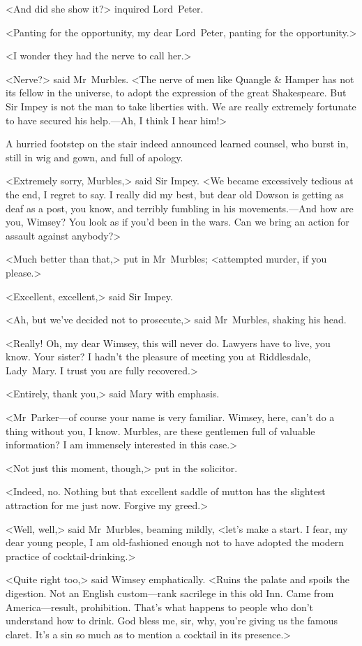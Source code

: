 <And did she show it?> inquired Lord~Peter.

<Panting for the opportunity, my dear Lord~Peter, panting for the opportunity.>

<I wonder they had the nerve to call her.>

<Nerve?> said Mr~Murbles. <The nerve of men like Quangle \& Hamper has not its fellow in the universe, to adopt the expression of the great Shakespeare. But Sir Impey is not the man to take liberties with. We are really extremely fortunate to have secured his help.—Ah, I think I hear him!>

A hurried footstep on the stair indeed announced learned counsel, who burst in, still in wig and gown, and full of apology.

<Extremely sorry, Murbles,> said Sir Impey. <We became excessively tedious at the end, I regret to say. I really did my best, but dear old Dowson is getting as deaf as a post, you know, and terribly fumbling in his movements.—And how are you, Wimsey? You look as if you'd been in the wars. Can we bring an action for assault against anybody?>

<Much better than that,> put in Mr~Murbles; <attempted murder, if you please.>

<Excellent, excellent,> said Sir Impey.

<Ah, but we've decided not to prosecute,> said Mr~Murbles, shaking his head.

<Really! Oh, my dear Wimsey, this will never do. Lawyers have to live, you know. Your sister? I hadn't the pleasure of meeting you at Riddlesdale, Lady~Mary. I trust you are fully recovered.>

<Entirely, thank you,> said Mary with emphasis.

<Mr~Parker—of course your name is very familiar. Wimsey, here, can't do a thing without you, I know. Murbles, are these gentlemen full of valuable information? I am immensely interested in this case.>

<Not just this moment, though,> put in the solicitor.

<Indeed, no. Nothing but that excellent saddle of mutton has the slightest attraction for me just now. Forgive my greed.>

<Well, well,> said Mr~Murbles, beaming mildly, <let's make a start.  I fear, my dear young people, I am old-fashioned enough not to have adopted the modern practice of cocktail-drinking.>

<Quite right too,> said Wimsey emphatically. <Ruins the palate and spoils the digestion. Not an English custom—rank sacrilege in this old Inn. Came from America—result, prohibition. That's what happens to people who don't understand how to drink. God bless me, sir, why, you're giving us the famous claret. It's a sin so much as to mention a cocktail in its presence.>

